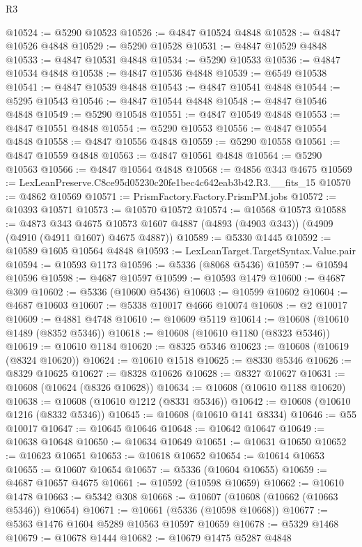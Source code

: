 \begin{lexlean}{R3}
\begin{coremodule}
@10524 := @5290 @10523
@10526 := @4847 @10524 @4848
@10528 := @4847 @10526 @4848
@10529 := @5290 @10528
@10531 := @4847 @10529 @4848
@10533 := @4847 @10531 @4848
@10534 := @5290 @10533
@10536 := @4847 @10534 @4848
@10538 := @4847 @10536 @4848
@10539 := @6549 @10538
@10541 := @4847 @10539 @4848
@10543 := @4847 @10541 @4848
@10544 := @5295 @10543
@10546 := @4847 @10544 @4848
@10548 := @4847 @10546 @4848
@10549 := @5290 @10548
@10551 := @4847 @10549 @4848
@10553 := @4847 @10551 @4848
@10554 := @5290 @10553
@10556 := @4847 @10554 @4848
@10558 := @4847 @10556 @4848
@10559 := @5290 @10558
@10561 := @4847 @10559 @4848
@10563 := @4847 @10561 @4848
@10564 := @5290 @10563
@10566 := @4847 @10564 @4848
@10568 := @4856 @343 @4675
@10569 := LexLeanPreserve.C8ce95d05230c20fe1bec4c642eab3b42.R3.__fits_15
@10570 := @4862 @10569
@10571 := PrismFactory.Factory.PrismPM.jobs
@10572 := @10393 @10571
@10573 := @10570 @10572
@10574 := @10568 @10573
@10588 := @4873
    @343
    @4675
    @10573
    @1607
    @4887
    (@4893 (@4903 @343))
    (@4909 (@4910 (@4911 @1607) @4675 @4887))
@10589 := @5330 @1445
@10592 := @10589 @1605 @10564 @4848
@10593 := LexLeanTarget.TargetSyntax.Value.pair
@10594 := @10593 @1173
@10596 := @5336 (@8068 @5436)
@10597 := @10594 @10596
@10598 := @4687 @10597
@10599 := @10593 @1479
@10600 := @4687 @309
@10602 := @5336 (@10600 @5436)
@10603 := @10599 @10602
@10604 := @4687 @10603
@10607 := @5338 @10017 @4666 @10074
@10608 := @2 @10017
@10609 := @4881 @4748
@10610 := @10609 @5119
@10614 := @10608 (@10610 @1489 (@8352 @5346))
@10618 := @10608 (@10610 @1180 (@8323 @5346))
@10619 := @10610 @1184
@10620 := @8325 @5346
@10623 := @10608 (@10619 (@8324 @10620))
@10624 := @10610 @1518
@10625 := @8330 @5346
@10626 := @8329 @10625
@10627 := @8328 @10626
@10628 := @8327 @10627
@10631 := @10608 (@10624 (@8326 @10628))
@10634 := @10608 (@10610 @1188 @10620)
@10638 := @10608 (@10610 @1212 (@8331 @5346))
@10642 := @10608 (@10610 @1216 (@8332 @5346))
@10645 := @10608 (@10610 @141 @8334)
@10646 := @55 @10017
@10647 := @10645 @10646
@10648 := @10642 @10647
@10649 := @10638 @10648
@10650 := @10634 @10649
@10651 := @10631 @10650
@10652 := @10623 @10651
@10653 := @10618 @10652
@10654 := @10614 @10653
@10655 := @10607 @10654
@10657 := @5336 (@10604 @10655)
@10659 := @4687 @10657 @4675
@10661 := @10592 (@10598 @10659)
@10662 := @10610 @1478
@10663 := @5342 @308
@10668 := @10607 (@10608 (@10662 (@10663 @5346)) @10654)
@10671 := @10661 (@5336 (@10598 @10668))
@10677 := @5363 @1476 @1604 @5289 @10563 @10597 @10659
@10678 := @5329 @1468
@10679 := @10678 @1444
@10682 := @10679 @1475 @5287 @4848

\end{coremodule}
\end{lexlean}
